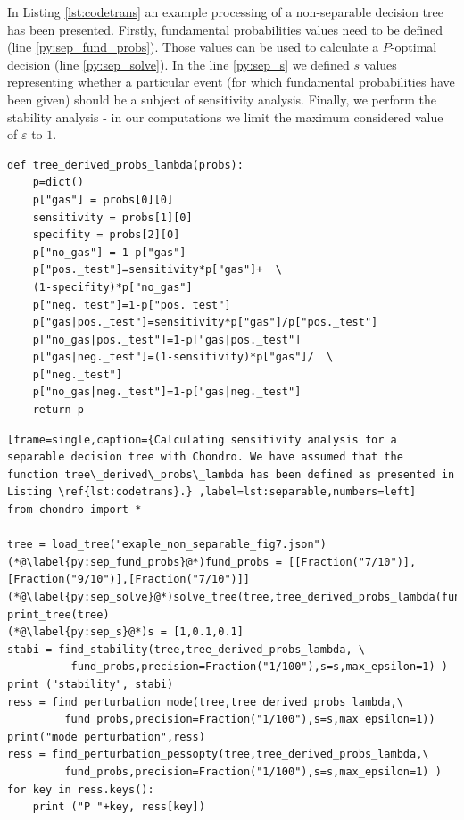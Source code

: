 \documentclass[a4paper,10pt,english]{sphinxmanual}
\begin{document}
In Listing \ref{lst:codetrans} an example processing of a non-separable decision tree has been presented. Firstly, fundamental probabilities values need to be defined (line \ref{py:sep_fund_probs}). Those values can be used to calculate a $P$-optimal decision (line \ref{py:sep_solve}). In the line \ref{py:sep_s} we defined $s$ values representing whether a particular event (for which fundamental probabilities have been given) should be a subject of sensitivity analysis. 
Finally, we perform the stability analysis - in our computations we limit the maximum considered value of $\varepsilon$ to $1$. 
	
\noindent\begin{minipage}{\linewidth}
	\begin{lstlisting}[frame=single,caption=Source code for function transforming separable probabilities (\texttt{probs}) into non-separable probabilities at nodes of the tree presented in Figure \ref{fig:json2},label=lst:codetrans] 
def tree_derived_probs_lambda(probs): 
	p=dict()
	p["gas"] = probs[0][0]
	sensitivity = probs[1][0]
	specifity = probs[2][0]
	p["no_gas"] = 1-p["gas"]
	p["pos._test"]=sensitivity*p["gas"]+  \
	(1-specifity)*p["no_gas"]
	p["neg._test"]=1-p["pos._test"]
	p["gas|pos._test"]=sensitivity*p["gas"]/p["pos._test"]
	p["no_gas|pos._test"]=1-p["gas|pos._test"]
	p["gas|neg._test"]=(1-sensitivity)*p["gas"]/  \
	p["neg._test"]
	p["no_gas|neg._test"]=1-p["gas|neg._test"]
	return p
	\end{lstlisting}
\end{minipage}

\noindent\begin{minipage}{\linewidth}
	\begin{lstlisting}[frame=single,caption={Calculating sensitivity analysis for a separable decision tree with Chondro. We have assumed that the function tree\_derived\_probs\_lambda has been defined as presented in Listing \ref{lst:codetrans}.} ,label=lst:separable,numbers=left] 
from chondro import *

tree = load_tree("exaple_non_separable_fig7.json")
(*@\label{py:sep_fund_probs}@*)fund_probs = [[Fraction("7/10")],[Fraction("9/10")],[Fraction("7/10")]]
(*@\label{py:sep_solve}@*)solve_tree(tree,tree_derived_probs_lambda(fund_probs))
print_tree(tree)
(*@\label{py:sep_s}@*)s = [1,0.1,0.1]
stabi = find_stability(tree,tree_derived_probs_lambda, \
          fund_probs,precision=Fraction("1/100"),s=s,max_epsilon=1) )
print ("stability", stabi)
ress = find_perturbation_mode(tree,tree_derived_probs_lambda,\
         fund_probs,precision=Fraction("1/100"),s=s,max_epsilon=1))
print("mode perturbation",ress)
ress = find_perturbation_pessopty(tree,tree_derived_probs_lambda,\
         fund_probs,precision=Fraction("1/100"),s=s,max_epsilon=1) )
for key in ress.keys():
    print ("P "+key, ress[key])
	\end{lstlisting}
\end{minipage}
\end{document}
